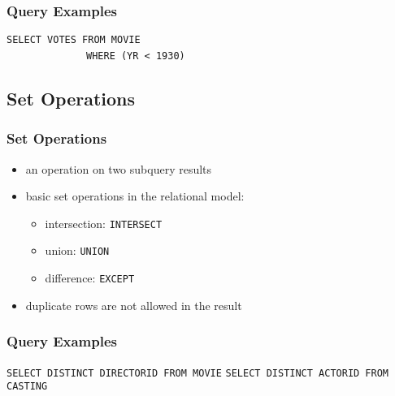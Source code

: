 \documentclass[dvipsnames]{beamer}
\theoremstyle{plain}
\begin{document}
\begin{frame}[fragile]
  \frametitle{Query Examples}

  \begin{example}
\lstinline!SELECT VOTES FROM MOVIE!\\
~~~~~~~~~~~~~~\lstinline!WHERE (YR < 1930)!
  \end{example}
\end{frame}

\subsection{Set Operations}

\begin{frame}
  \frametitle{Set Operations}

  \begin{itemize}
    \item an operation on two subquery results

    \item basic set operations in the relational model:
    \begin{itemize}
      \item intersection: \lstinline!INTERSECT!
      \item union: \lstinline!UNION!
      \item difference: \lstinline!EXCEPT!
    \end{itemize}

    \pause
    \item duplicate rows are not allowed in the result
  \end{itemize}
\end{frame}

\begin{frame}[fragile]
  \frametitle{Query Examples}

  \begin{example}
\lstinline!SELECT DISTINCT DIRECTORID FROM MOVIE!
\lstinline!SELECT DISTINCT ACTORID FROM CASTING!
  \end{example}
\end{frame}
\end{document}
